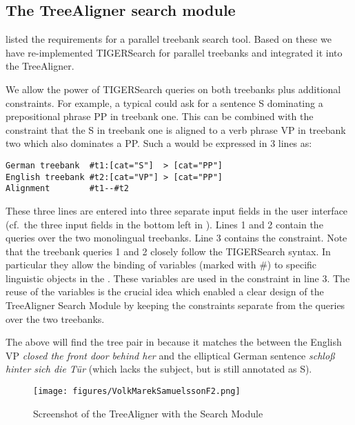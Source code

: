 \documentclass[output=paper]{LSP/langsci}
\begin{document}
\subsection{The TreeAligner search module}\label{sec:volk:3.2}

\citet{Merz2005} listed the requirements for a parallel treebank search tool. Based on these we have re-implemented TIGERSearch for parallel treebanks and integrated it into the TreeAligner. 

We allow the power of TIGERSearch queries on both treebanks plus additional  constraints. For example, a typical  could ask for a sentence S dominating a prepositional phrase PP in treebank one. This  can be combined with the constraint that the S in treebank one is aligned to a verb phrase VP in treebank two which also dominates a PP. Such a  would be expressed in 3 lines as:

\ea
\begin{lstlisting}
German treebank  #t1:[cat="S"]  > [cat="PP"]
English treebank #t2:[cat="VP"] > [cat="PP"]
Alignment        #t1--#t2 
\end{lstlisting}
\z

These three lines are entered into three separate input fields in the user interface (cf.~the three input fields in the bottom left in ). Lines 1 and 2 contain the queries over the two monolingual treebanks. Line 3 contains the  constraint. Note that the treebank queries 1 and 2 closely follow the TIGERSearch syntax. In particular they allow the binding of variables (marked with \#) to specific linguistic objects in the . These variables are used in the  constraint in line 3. The reuse of the variables is the crucial idea which enabled a clear design of the TreeAligner Search Module by keeping the  constraints separate from the queries over the two treebanks. 

The above  will find the tree pair in  because it matches the  between the English VP \textit{closed the front door behind her} and the elliptical German sentence \textit{schloß hinter sich die Tür} (which lacks the subject, but is still annotated as S). 

\begin{figure}
\texttt{[image: figures/VolkMarekSamuelssonF2.png]}
\caption{Screenshot of the TreeAligner with the Search Module}
\label{fig:volkmareksamuelsson:2}
\end{figure}
\end{document}
